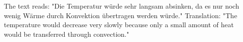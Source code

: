 The text reads:  
"Die Temperatur würde sehr langsam absinken, da es nur noch wenig Wärme durch Konvektion übertragen werden würde."  
Translation:  
"The temperature would decrease very slowly because only a small amount of heat would be transferred through convection."